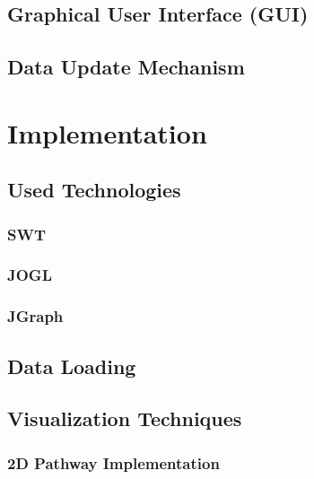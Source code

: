 
\section{Graphical User Interface (GUI)}

\section{Data Update Mechanism}


\chapter{Implementation}

\section{Used Technologies}
\subsection{SWT}


\subsection{JOGL}


\subsection{JGraph}

\section{Data Loading}

\section{Visualization Techniques}

\subsection{2D Pathway Implementation}
